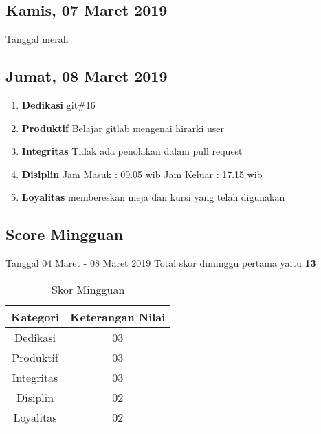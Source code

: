 \subsection{Kamis, 07 Maret 2019}
Tanggal merah

\subsection{Jumat, 08 Maret 2019}
\begin{enumerate}
\item \textbf{Dedikasi}
\subitem git\#16
\item \textbf{Produktif}
\subitem Belajar gitlab mengenai hirarki user 
\item \textbf{Integritas}
\subitem Tidak ada penolakan dalam pull request
\item \textbf{Disiplin}
\subitem Jam Masuk : 09.05 wib
\subitem Jam Keluar : 17.15 wib
\item \textbf{Loyalitas}
\subitem membereskan meja dan kursi yang telah digunakan
\end{enumerate}

\subsection{Score Mingguan} 
Tanggal 04 Maret - 08 Maret 2019 Total skor diminggu pertama yaitu \textbf{13}

\begin{table}[h]
\caption{Skor Mingguan}
\centering
\begin{tabular}{|c|c|}
\hline
\textbf{Kategori}&\textbf{Keterangan Nilai}\\
\hline
Dedikasi&03\\
\hline
Produktif&03\\
\hline
Integritas&03\\
\hline
Disiplin&02\\
\hline
Loyalitas&02\\
\hline
\end{tabular}
\label{table : skor minggu kedua}
\end{table}